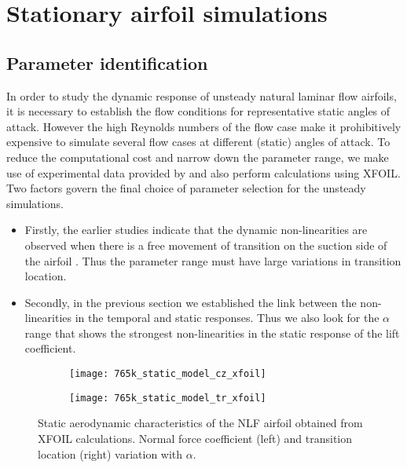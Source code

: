 \section{Stationary airfoil simulations}

\subsection{Parameter identification}

In order to study the dynamic response of unsteady natural laminar flow airfoils, it is necessary to establish the flow conditions for representative static angles of attack. However the high Reynolds numbers of the flow case make it prohibitively expensive to simulate several flow cases at different (static) angles of attack. To reduce the computational cost and narrow down the parameter range, we make use of experimental data provided by \cite{lokattthesis} and also perform calculations using XFOIL. Two factors govern the final choice of parameter selection for the unsteady simulations. 
\begin{itemize}
	\item Firstly, the earlier studies indicate that the dynamic non-linearities are observed when there is a free movement of transition on the suction side of the airfoil \citep{mai11,hebler13,lokattthesis}. Thus the parameter range must have large variations in transition location.  
	\item Secondly, in the previous section we established the link between the non-linearities in the temporal and static responses. Thus we also look for the $\alpha$ range that shows the strongest non-linearities in the static response of the lift coefficient.
\end{itemize}
\begin{figure}[h]
	\centering
	\begin{subfigure}[t]{0.48\textwidth}
		\caption{}		
		\texttt{[image: 765k\_static\_model\_cz\_xfoil]}
		\label{fig:cz_static_xfoil}
	\end{subfigure}
	\begin{subfigure}[t]{0.48\textwidth}
		\caption{}		
		\texttt{[image: 765k\_static\_model\_tr\_xfoil]}
		\label{fig:tr_static_xfoil}
	\end{subfigure}	
	\caption{Static aerodynamic characteristics of the NLF airfoil obtained from XFOIL calculations. Normal force coefficient (left) and transition location (right) variation with $\alpha$.}
	\label{fig:static_characteristics}
\end{figure}
